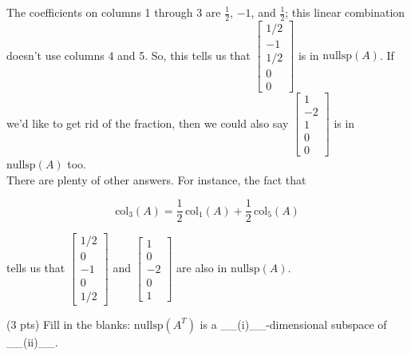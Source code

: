\documentclass[11pt]{article}
\begin{document}
\begin{prob}
\begin{subprob}
\begin{solution}
The coefficients on columns 1 through 3 are $\frac{1}{2}$, $-1$, and $\frac{1}{2}$; this linear combination doesn't use columns 4 and 5. So, this tells us that $\begin{bmatrix} 1/2 \\ -1 \\ 1/2 \\ 0 \\ 0 \end{bmatrix}$ is in $\text{nullsp}(A)$. If we'd like to get rid of the fraction, then we could also say $\begin{bmatrix} 1 \\ -2 \\ 1 \\ 0 \\ 0 \end{bmatrix}$ is in $\text{nullsp}(A)$ too. \\

There are plenty of other answers. For instance, the fact that

$$\text{col}_3(A) = \frac{1}{2}\,\text{col}_1(A) + \frac{1}{2}\,\text{col}_5(A)$$

tells us that $\begin{bmatrix} 1/2 \\ 0 \\ -1 \\ 0 \\ 1/2 \end{bmatrix}$ and $\begin{bmatrix} 1 \\ 0 \\ -2 \\ 0 \\ 1 \end{bmatrix}$ are also in $\text{nullsp}(A)$.

\end{solution}
\end{subprob}

\vspace{0.2in}

\begin{subprob}(3 pts) Fill in the blanks: $\text{nullsp}(A^T)$ is a \_\_(i)\_\_-dimensional subspace of \_\_(ii)\_\_. \\


\end{subprob}
\end{prob}
\end{document}
